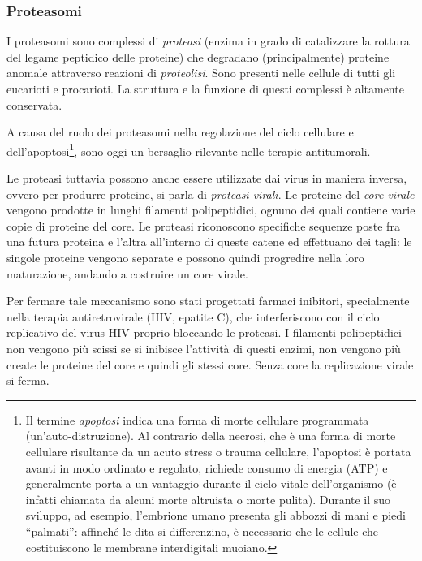 {\subsubsection{Proteasomi}
\par I proteasomi sono complessi di \textit{proteasi} (enzima in grado di catalizzare la rottura del legame peptidico delle proteine) che 
degradano (principalmente) proteine anomale attraverso reazioni di \textit{proteolisi}. Sono presenti nelle cellule di tutti gli eucarioti e procarioti. La struttura e la funzione di questi complessi è altamente conservata.

\par A causa del ruolo dei proteasomi nella regolazione del ciclo cellulare e dell'apoptosi\footnote{Il termine \textit{apoptosi} indica una forma di morte cellulare programmata (un'auto-distruzione). Al contrario della necrosi, che è una forma di morte cellulare risultante da un acuto stress o trauma cellulare, l'apoptosi è portata avanti in modo ordinato e regolato, richiede consumo di energia (ATP) e generalmente porta a un vantaggio durante il ciclo vitale dell'organismo (è infatti chiamata da alcuni morte altruista o morte pulita). Durante il suo sviluppo, ad esempio, l'embrione umano presenta gli abbozzi di mani e piedi “palmati”: affinché le dita si differenzino, è necessario che le cellule che costituiscono le membrane interdigitali muoiano.}, sono oggi un bersaglio rilevante nelle terapie antitumorali. 

\par Le proteasi tuttavia possono anche essere utilizzate dai virus in maniera inversa, ovvero per produrre proteine, si parla di \textit{proteasi virali}\supercite{proteasiVirale}. Le proteine del \textit{core virale} vengono prodotte in lunghi filamenti polipeptidici, ognuno dei quali contiene varie copie di proteine del core. Le proteasi riconoscono specifiche sequenze poste fra una futura proteina e l'altra all'interno di queste catene ed effettuano dei tagli: le singole proteine vengono separate e possono quindi progredire nella loro maturazione, andando a costruire un core virale. 

\par Per fermare tale meccanismo sono stati progettati farmaci inibitori, specialmente nella terapia antiretrovirale (HIV, epatite C), che interferiscono con il ciclo replicativo del virus HIV proprio bloccando le proteasi. I filamenti polipeptidici non vengono più scissi se si inibisce l'attività di questi enzimi, non vengono più create le proteine del core e quindi gli stessi core. Senza core la replicazione virale si ferma.

}
